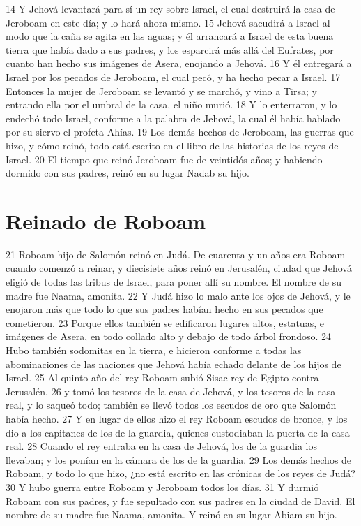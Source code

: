 14 Y Jehová levantará para sí un rey sobre Israel, el cual destruirá la casa de Jeroboam en este día; y lo hará ahora mismo.
15 Jehová sacudirá a Israel al modo que la caña se agita en las aguas; y él arrancará a Israel de esta buena tierra que había dado a sus padres, y los esparcirá más allá del Eufrates, por cuanto han hecho sus imágenes de Asera, enojando a Jehová.
16 Y él entregará a Israel por los pecados de Jeroboam, el cual pecó, y ha hecho pecar a Israel.
17 Entonces la mujer de Jeroboam se levantó y se marchó, y vino a Tirsa; y entrando ella por el umbral de la casa, el niño murió.
18 Y lo enterraron, y lo endechó todo Israel, conforme a la palabra de Jehová, la cual él había hablado por su siervo el profeta Ahías.
19 Los demás hechos de Jeroboam, las guerras que hizo, y cómo reinó, todo está escrito en el libro de las historias de los reyes de Israel.
20 El tiempo que reinó Jeroboam fue de veintidós años; y habiendo dormido con sus padres, reinó en su lugar Nadab su hijo.
\section*{Reinado de Roboam}

 
21 Roboam hijo de Salomón reinó en Judá. De cuarenta y un años era Roboam cuando comenzó a reinar, y diecisiete años reinó en Jerusalén, ciudad que Jehová eligió de todas las tribus de Israel, para poner allí su nombre. El nombre de su madre fue Naama, amonita.
22 Y Judá hizo lo malo ante los ojos de Jehová, y le enojaron más que todo lo que sus padres habían hecho en sus pecados que cometieron.
23 Porque ellos también se edificaron lugares altos, estatuas, e imágenes de Asera, en todo collado alto y debajo de todo árbol frondoso. 
24 Hubo también sodomitas en la tierra, e hicieron conforme a todas las abominaciones de las naciones que Jehová había echado delante de los hijos de Israel.
25 Al quinto año del rey Roboam subió Sisac rey de Egipto contra Jerusalén, 
26 y tomó los tesoros de la casa de Jehová, y los tesoros de la casa real, y lo saqueó todo; también se llevó todos los escudos de oro que Salomón había hecho. 
27 Y en lugar de ellos hizo el rey Roboam escudos de bronce, y los dio a los capitanes de los de la guardia, quienes custodiaban la puerta de la casa real.
28 Cuando el rey entraba en la casa de Jehová, los de la guardia los llevaban; y los ponían en la cámara de los de la guardia.
29 Los demás hechos de Roboam, y todo lo que hizo, ¿no está escrito en las crónicas de los reyes de Judá?
30 Y hubo guerra entre Roboam y Jeroboam todos los días.
31 Y durmió Roboam con sus padres, y fue sepultado con sus padres en la ciudad de David. El nombre de su madre fue Naama, amonita. Y reinó en su lugar Abiam su hijo.

